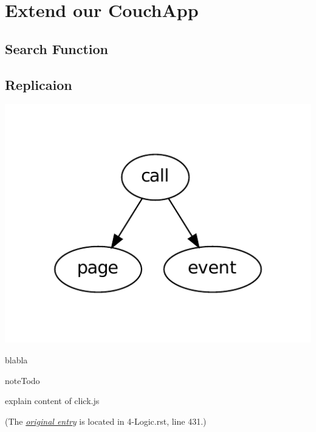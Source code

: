 \documentclass[letterpaper,10pt,english]{sphinxmanual}
\begin{document}
\chapter{Extend our CouchApp}
\label{99-Expand::doc}\label{99-Expand:extend-our-couchapp}

\section{Search Function}
\label{99-Expand:search-function}

\section{Replicaion}
\label{99-Expand:replicaion}
\includegraphics{graphviz-aaf431e8c49359e27d2f80e983944a8f1021fef9.pdf}

blabla

\begin{notice}{note}{Todo}

explain content of click.js
\end{notice}

(The {\hyperref[4-Logic:index-0]{\emph{original entry}}} is located in  4-Logic.rst, line 431.)



\renewcommand{\indexname}{Index}
\printindex
\end{document}
